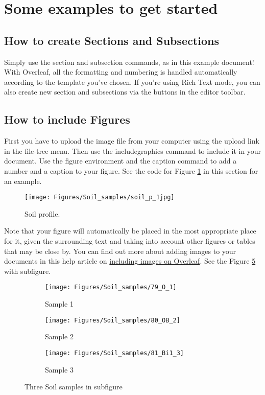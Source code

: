 \documentclass[a4paper,12pt,twoside]{article}
\begin{document}
\section{Some examples to get started}

\subsection{How to create Sections and Subsections}

Simply use the section and subsection commands, as in this example document! With Overleaf, all the formatting and numbering is handled automatically according to the template you've chosen. If you're using Rich Text mode, you can also create new section and subsections via the buttons in the editor toolbar.

\subsection{How to include Figures}

First you have to upload the image file from your computer using the upload link in the file-tree menu. Then use the includegraphics command to include it in your document. Use the figure environment and the caption command to add a number and a caption to your figure. See the code for Figure \ref{fig:sample01} in this section for an example.

\begin{figure}
\centering
\texttt{[image: Figures/Soil\_samples/soil\_p\_1jpg]}
\caption{Soil profile.}
\label{fig:sample01}
\end{figure}

Note that your figure will automatically be placed in the most appropriate place for it, given the surrounding text and taking into account other figures or tables that may be close by. You can find out more about adding images to your documents in this help article on \href{https://www.overleaf.com/learn/how-to/Including_images_on_Overleaf}{including images on Overleaf}.
See the Figure \ref{fig:soil_samples} with subfigure.

\begin{figure}
     \centering
     \begin{subfigure}[b]{0.3\textwidth}
         \centering
         \texttt{[image: Figures/Soil\_samples/79\_O\_1]}
         \caption{Sample 1}
         \label{fig:horiz1}
     \end{subfigure}
     \hfill
     \begin{subfigure}[b]{0.3\textwidth}
         \centering
         \texttt{[image: Figures/Soil\_samples/80\_OB\_2]}
         \caption{Sample 2}
         \label{fig:horiz2}
     \end{subfigure}
     \hfill
     \begin{subfigure}[b]{0.3\textwidth}
         \centering
         \texttt{[image: Figures/Soil\_samples/81\_Bi1\_3]}
         \caption{Sample 3}
         \label{fig:horiz3}
     \end{subfigure}
        \caption{Three Soil samples in subfigure}
        \label{fig:soil_samples}
\end{figure}
\end{document}
